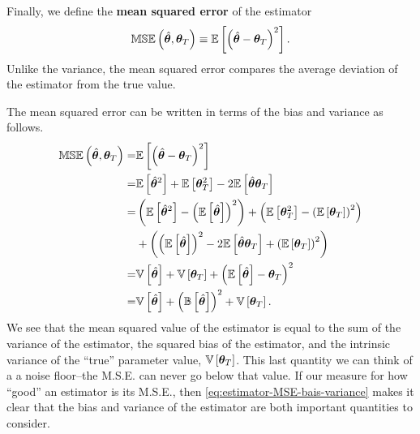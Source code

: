 Finally, we define the \textbf{mean squared error} of the estimator
\begin{align}
    \label{eq:estimator-mse-definition}
    \mathbb{MSE}\left(\hat{{\bm \theta}},{\bm \theta}_T\right)
    \equiv
    \mathbb{E}\left[\left(\hat{{\bm \theta}} - {\bm \theta}_T\right)^2\right]
    .
\end{align}
Unlike the variance, the mean squared error compares the average deviation of the estimator from the true value.

The mean squared error can be written in terms of the bias and variance as follows.
\begin{align}
    \label{eq:estimator-MSE-bais-variance}
    \mathbb{MSE}\left(\hat{{\bm \theta}},{\bm \theta}_T\right)
    =&
    \mathbb{E}\left[\left(\hat{{\bm \theta}} - {\bm \theta}_T\right)^2\right]
    \nonumber\\
    =&
    \mathbb{E}\left[\hat{{\bm \theta}}^2\right]
    +
    \mathbb{E}\left[{\bm \theta}_T^2\right]
    - 
    2\mathbb{E}\left[\hat{{\bm \theta}}{\bm \theta}_T\right]
    \nonumber\\
    =&
    \left(\mathbb{E}\left[
        \hat{{\bm \theta}}^2\right] 
        - 
        \left(\mathbb{E}\left[\hat{{\bm \theta}}\right]\right)^2
    \right)
    +
    \left(
        \mathbb{E}\left[{\bm \theta}_T^2\right] 
        - 
        \left(\mathbb{E}\left[{\bm \theta}_T\right]\right)^2
    \right)
    \nonumber\\
    &
    +
    \left(
        \left(\mathbb{E}\left[\hat{{\bm \theta}}\right]\right)^2
        - 
        2\mathbb{E}\left[\hat{{\bm \theta}}{\bm \theta}_T\right]
        +
        \left(\mathbb{E}\left[{\bm \theta}_T\right]\right)^2
    \right)
    \nonumber\\
    =&
    \mathbb{V}\left[\hat{{\bm \theta}}\right]
    +
    \mathbb{V}\left[{\bm \theta}_T\right]
    +
    \left(\mathbb{E}\left[\hat{{\bm \theta}}\right] - {\bm \theta}_T\right)^2
    \nonumber\\
    =&
    \mathbb{V}\left[\hat{{\bm \theta}}\right]
    +
    \left(\mathbb{B}\left[\hat{{\bm \theta}}\right]\right)^2
    +
    \mathbb{V}\left[{\bm \theta}_T\right]
    .
\end{align}
We see that the mean squared value of the estimator is equal to the sum of the variance of the estimator, the squared bias of the estimator, and the intrinsic variance of the ``true'' parameter value, $\mathbb{V}\left[{\bm \theta}_T\right]$.
This last quantity we can think of a a noise floor--the M.S.E. can never go below that value.
If our measure for how ``good'' an estimator is its M.S.E., then \eqref{eq:estimator-MSE-bais-variance} makes it clear that the bias and variance of the estimator are both important quantities to consider.
